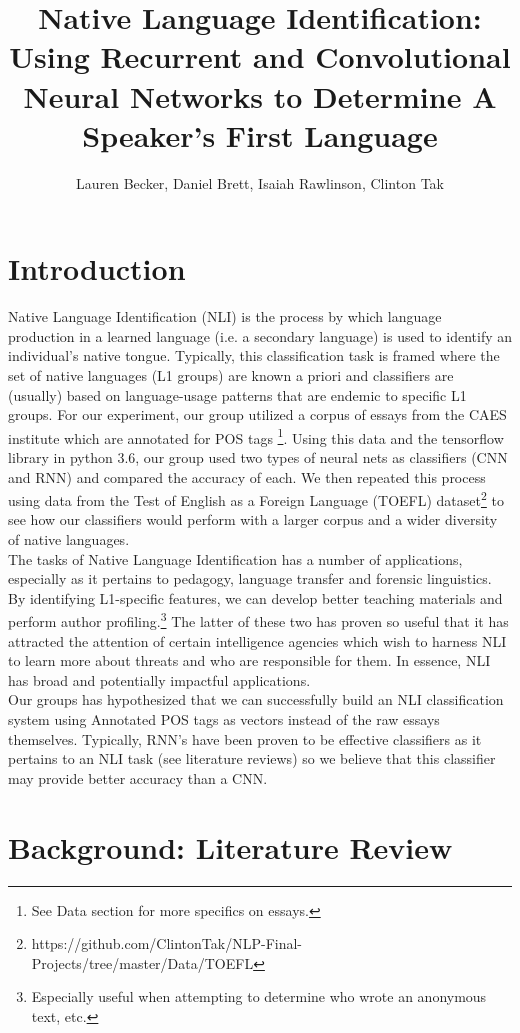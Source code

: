 \documentclass[11pt,a4paper]{article}
\title{Native Language Identification: Using Recurrent and Convolutional Neural Networks to Determine A Speaker's First Language}
\author{Lauren Becker, Daniel Brett, Isaiah Rawlinson, Clinton Tak}
\date{}
\newcommand\tab[1][1cm]{\hspace*{#1}}
\begin{document}
\maketitle



\section{Introduction}
 Native Language Identification (NLI) is the process by which language production in a learned language (i.e. a secondary language) is used to identify an individual's native tongue. Typically, this classification task is framed where the set of native languages (L1 groups) are known a priori and classifiers are (usually) based on language-usage patterns that are endemic to specific L1 groups. For our experiment, our group utilized a corpus of essays from the CAES institute which are annotated for POS tags \footnote{See Data section for more specifics on essays.}. Using this data and the tensorflow library in python 3.6, our group used two types of neural nets as classifiers (CNN and RNN) and compared the accuracy of each. We then repeated this process using data from the Test of English as a Foreign Language (TOEFL) dataset\footnote{https://github.com/ClintonTak/NLP-Final-Projects/tree/master/Data/TOEFL} to see how our classifiers would perform with a larger corpus and a wider diversity of native languages.\\
 \tab The tasks of Native Language Identification has a number of applications, especially as it pertains to pedagogy, language transfer and forensic linguistics. By identifying L1-specific features, we can develop better teaching materials and perform author profiling.\footnote{Especially useful when attempting to determine who wrote an anonymous text, etc.} The latter of these two has proven so useful that it has attracted the attention of certain intelligence agencies which wish to harness NLI to learn more about threats and who are responsible for them. In essence, NLI has broad and potentially impactful applications.\\
 \tab Our groups has hypothesized that we can successfully build an NLI classification system using Annotated POS tags as vectors instead of the raw essays themselves. Typically, RNN's have been proven to be effective classifiers as it pertains to an NLI task (see literature reviews) so we believe that this classifier may provide better accuracy than a CNN.
 
 \section{Background: Literature Review}
\end{document}
